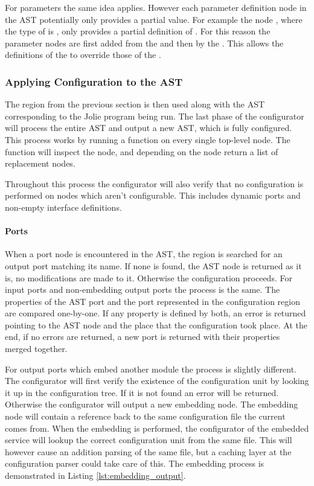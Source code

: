 For parameters the same idea applies. However each parameter definition node in
the AST potentially only provides a partial value. For example the node
, where the type of  is , only provides a partial definition of . For this
reason the parameter nodes are first added from the  and then by
the . This allows the definitions of the  to override
those of the .

\subsubsection*{Applying Configuration to the AST}

The  region from the previous section is then used along
with the AST corresponding to the Jolie program being run. The last phase of
the configurator will process the entire AST and output a new AST, which is
fully configured. This process works by running a  function on
every single top-level node. The  function will inspect the node,
and depending on the node return a list of replacement nodes.

Throughout this process the configurator will also verify that no configuration
is performed on nodes which aren't configurable. This includes dynamic ports
and non-empty interface definitions.

\paragraph{Ports}

When a port node is encountered in the AST, the  region is
searched for an output port matching its name. If none is found, the AST node
is returned as it is, no modifications are made to it. Otherwise the
configuration proceeds. For input ports and non-embedding output ports the
process is the same. The properties of the AST port and the port represented in
the configuration region are compared one-by-one. If any property is defined by
both, an error is returned pointing to the AST node and the place that the
configuration took place. At the end, if no errors are returned, a new port is
returned with their properties merged together.

For output ports which embed another module the process is slightly different.
The configurator will first verify the existence of the configuration unit by
looking it up in the configuration tree. If it is not found an error will be
returned. Otherwise the configurator will output a new embedding node. The
embedding node will contain a reference back to the same configuration file the
current  comes from. When the embedding is performed, the
configurator of the embedded service will lookup the correct configuration unit
from the same file. This will however cause an addition parsing of the same
file, but a caching layer at the configuration parser could take care of this.
The embedding process is demonstrated in Listing \ref{lst:embedding_output}.

